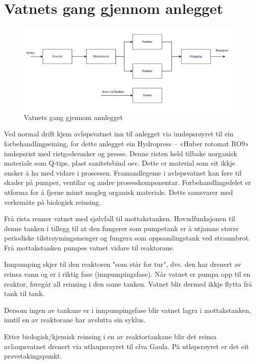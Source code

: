 \newpage
\section{Vatnets gang gjennom anlegget}
\begin{figure}[htbp]
    \centering
    \includegraphics[width=1\textwidth]{Figurar/VannetsGangGjennomAnlegget.png}
    \caption{Vatnets gang gjennom annlegget}\label{fig:Vatnets Gang}
\end{figure}

Ved normal drift kjem avløpsvatnet inn til anlegget via innløpsrøyret til ein forbehandlingseining, for dette anlegget ein Hydropress – «Huber rotomat RO9» innløpsrist med ristgodsvasker og presse.
Denne risten held tilbake uorganisk materiale som Q-tips, plast sanitetsbind osv. Dette er material som eit ikkje ønsker å ha med vidare i prosessen. 
Framandlegeme i avløpsvatnet kan føre til skader på pumper, ventilar og andre prosesskomponentar. Forbehandlingsdelet er utforma for å fjerne minst mogleg organisk materiale. Dette samsvarer med verkemåte på biologisk reinsing.

Frå rista renner vatnet med sjølvfall til mottakstanken. Hovudfunksjonen til denne tanken i tillegg til at den fungerer som pumpetank er å utjamne større periodiske tilstrøymingsmenger og fungera som oppsamlingstank ved straumbrot. 
Frå mottakstanken pumpes vatnet vidare til reaktorane. 

Innpumping skjer til den reaktoren "som står for tur", dvs. den har drenert av reinsa vann og er i riktig fase (innpumpingsfase). 
Når vatnet er pumpa opp til en reaktor, føregår all reinsing i den same tanken. Vatnet blir dermed ikkje flytta frå tank til tank.

Dersom ingen av tankane er i innpumpingsfase blir vatnet lagra i mottakstanken, inntil en av reaktorane har avslutta sin syklus.

Etter biologisk/kjemisk reinsing i en av reaktortankane blir det reinsa avlaupsvatnet drenert via utlaupsrøyret til elva Gaula. 
På utløpsrøyret er det eit prøvetakingspunkt. 





    